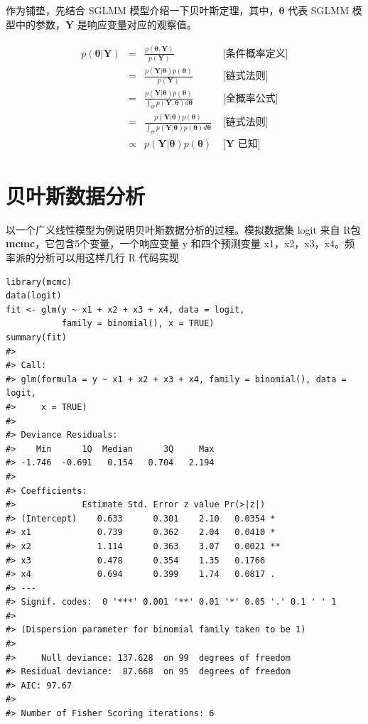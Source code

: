 \documentclass[12pt,a4paper,UTF8,twoside]{book}
\theoremstyle{definition}
\theoremstyle{definition}
\theoremstyle{definition}
\theoremstyle{remark}
\begin{document}
作为铺垫，先结合 SGLMM
模型介绍一下贝叶斯定理，其中，\(\boldsymbol{\theta}\) 代表 SGLMM
模型中的参数，\(\mathbf{Y}\) 是响应变量对应的观察值。

\begin{align}
\begin{array}{rcll}
p(\boldsymbol{\theta}|\mathbf{Y})  & =  & \displaystyle \frac{p(\boldsymbol{\theta},\mathbf{Y})}{p(\mathbf{Y})}
& \mbox{ [条件概率定义]}
\\[16pt]
& = & \displaystyle \frac{p(\mathbf{Y}|\boldsymbol{\theta}) p(\boldsymbol{\theta})}{p(\mathbf{Y})}
& \mbox{ [链式法则]}
\\[16pt]
& = & \displaystyle \frac{p(\mathbf{Y}|\boldsymbol{\theta})p(\boldsymbol{\theta})}{\int_{\Theta}p(\mathbf{Y},\boldsymbol{\theta})d\boldsymbol{\theta}}
& \mbox{ [全概率公式]}
\\[16pt]
& = & \displaystyle \frac{p(\mathbf{Y}|\boldsymbol{\theta})p(\boldsymbol{\theta})}{\int_{\Theta}p(\mathbf{Y}|\boldsymbol{\theta})p(\boldsymbol{\theta})d\boldsymbol{\theta}}
& \mbox{ [链式法则]}
\\[16pt]
& \propto & \displaystyle p(\mathbf{Y}|\boldsymbol{\theta})p(\boldsymbol{\theta})
& \mbox{ [$\mathbf{Y}$ 已知]}
\end{array} \label{eq:bayes-theorem}
\end{align}

\hypertarget{bayesian-data-analysis}{%
\section{贝叶斯数据分析}\label{bayesian-data-analysis}}

以一个广义线性模型为例说明贝叶斯数据分析的过程。模拟数据集 logit 来自
R包 \textbf{mcmc}，它包含5个变量，一个响应变量 y 和四个预测变量
x1，x2，x3，x4。频率派的分析可以用这样几行 R 代码实现

\begin{verbatim}
library(mcmc)
data(logit)
fit <- glm(y ~ x1 + x2 + x3 + x4, data = logit, 
           family = binomial(), x = TRUE)
summary(fit)
#> 
#> Call:
#> glm(formula = y ~ x1 + x2 + x3 + x4, family = binomial(), data = logit, 
#>     x = TRUE)
#> 
#> Deviance Residuals: 
#>    Min      1Q  Median      3Q     Max  
#> -1.746  -0.691   0.154   0.704   2.194  
#> 
#> Coefficients:
#>             Estimate Std. Error z value Pr(>|z|)   
#> (Intercept)    0.633      0.301    2.10   0.0354 * 
#> x1             0.739      0.362    2.04   0.0410 * 
#> x2             1.114      0.363    3.07   0.0021 **
#> x3             0.478      0.354    1.35   0.1766   
#> x4             0.694      0.399    1.74   0.0817 . 
#> ---
#> Signif. codes:  0 '***' 0.001 '**' 0.01 '*' 0.05 '.' 0.1 ' ' 1
#> 
#> (Dispersion parameter for binomial family taken to be 1)
#> 
#>     Null deviance: 137.628  on 99  degrees of freedom
#> Residual deviance:  87.668  on 95  degrees of freedom
#> AIC: 97.67
#> 
#> Number of Fisher Scoring iterations: 6
\end{verbatim}
\end{document}
